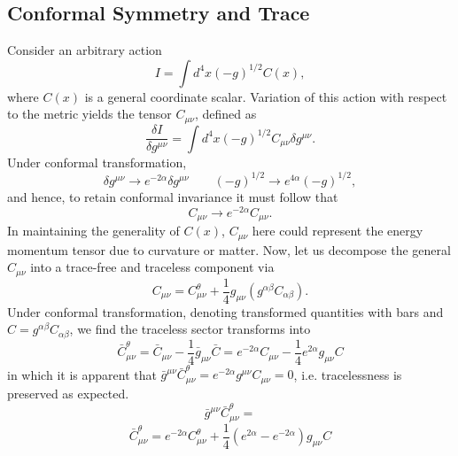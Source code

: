 \documentclass[10pt,letterpaper]{article}
\numberwithin{equation}{subsection}
\begin{document}
\subsection{Conformal Symmetry and Trace}
Consider an arbitrary action
\begin{equation}
	I = \int d^4x (-g)^{1/2} C(x),
\end{equation}
where $C(x)$ is a general coordinate scalar. Variation of this action with respect to the metric yields the tensor $C_{\mu\nu}$, defined as
\begin{equation} 
\frac{\delta I}{\delta g^{\mu\nu}} = \int d^4x (-g)^{1/2} C_{\mu\nu} \delta g^{\mu\nu}.
\end{equation} 
Under conformal transformation, 
\begin{equation}
\delta g^{\mu\nu} \to e^{-2\alpha}\delta g^{\mu\nu}\qquad (-g)^{1/2} \to e^{4\alpha}(-g)^{1/2},
\end{equation}
and hence, to retain conformal invariance it must follow that
\begin{equation}
C_{\mu\nu} \to e^{-2\alpha}C_{\mu\nu}.
\end{equation}
In maintaining the generality of $C(x)$, $C_{\mu\nu}$ here could represent the energy momentum tensor due to curvature or matter. Now, let us decompose the general $C_{\mu\nu}$ into a trace-free and traceless component via
\begin{equation}
C_{\mu\nu} = C^{\theta}_{\mu\nu} + \frac14 g_{\mu\nu}\left( g^{\alpha\beta} C_{\alpha\beta}\right).
\end{equation}
Under conformal transformation, denoting transformed quantities with bars and $C = g^{\alpha\beta}C_{\alpha\beta}$, we find the traceless sector transforms into
\begin{equation}
\bar C_{\mu\nu}^\theta = \bar C_{\mu\nu}- \frac14 \bar g_{\mu\nu} \bar C = e^{-2\alpha}C_{\mu\nu} - \frac14 e^{2\alpha} g_{\mu\nu} C
\end{equation}
in which it is apparent that $\bar g^{\mu\nu} \bar C^\theta_{\mu\nu} = e^{-2\alpha}g^{\mu\nu}C_{\mu\nu}= 0$, i.e. tracelessness is preserved as expected.
\begin{equation}
	\bar g^{\mu\nu} \bar C_{\mu\nu}^\theta = 
\end{equation}
\begin{equation}
	\bar C_{\mu\nu}^\theta = e^{-2\alpha} C_{\mu\nu}^\theta + \frac14 (e^{2\alpha} - e^{-2\alpha})g_{\mu\nu} C
\end{equation}

\end{document}
